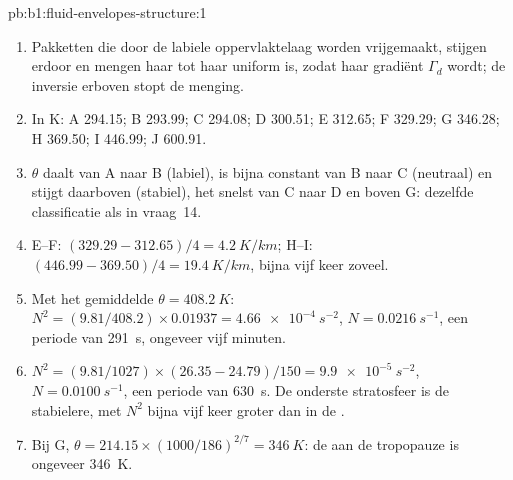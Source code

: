 \begin{solution}{pb:b1:fluid-envelopes-structure:1}
\begin{enumerate}
  \item Pakketten die door de labiele oppervlaktelaag worden vrijgemaakt, stijgen erdoor en mengen haar tot haar  uniform is, zodat haar gradiënt $\Gamma_d$ wordt; de inversie erboven stopt de menging.
  \item In K: A 294.15; B 293.99; C 294.08; D 300.51; E 312.65; F 329.29; G
        346.28; H 369.50; I 446.99; J 600.91.
  \item $\theta$ daalt van A naar B (labiel), is bijna constant van B naar C
        (neutraal) en stijgt daarboven (stabiel), het snelst van C naar D en boven
        G: dezelfde classificatie als in vraag~14.
  \item E--F: $(329.29 - 312.65)/4 = \qty{4.2}{K/km}$; H--I: $(446.99 -
        369.50)/4 = \qty{19.4}{K/km}$, bijna vijf keer zoveel.
  \item Met het gemiddelde $\theta = \qty{408.2}{K}$: $N^2 = (9.81/408.2) \times
        0.01937 = \qty{4.66e-4}{s^{-2}}$, $N = \qty{0.0216}{s^{-1}}$, een periode
        van \qty{291}{s}, ongeveer vijf minuten.
  \item $N^2 = (9.81/1027) \times (26.35 - 24.79)/150 = \qty{9.9e-5}{s^{-2}}$,
        $N = \qty{0.0100}{s^{-1}}$, een periode van \qty{630}{s}. De onderste stratosfeer is de stabielere, met $N^2$ bijna vijf keer groter
        dan in de .
  \item Bij G, $\theta = 214.15 \times (1000/186)^{2/7} = \qty{346}{K}$: de  aan de tropopauze is ongeveer \qty{346}{K}.
\end{enumerate}
\end{solution}
